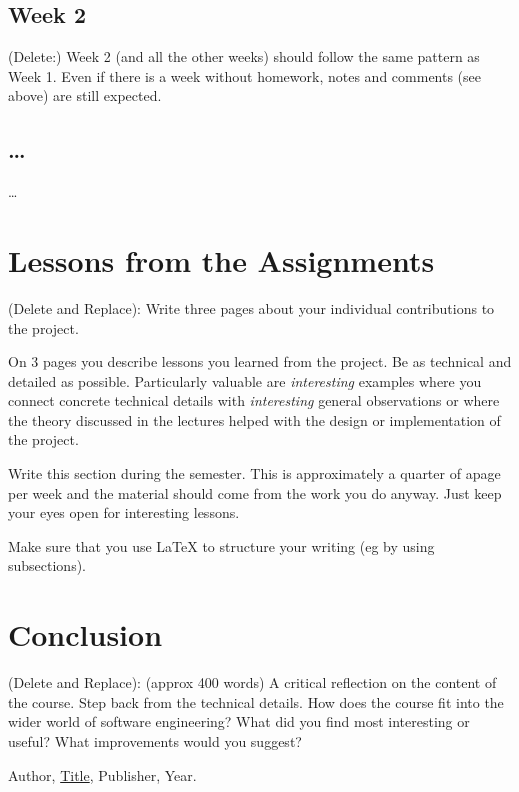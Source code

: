 \documentclass{article}
\theoremstyle{theorem}
\theoremstyle{definition}
\theoremstyle{remark}
\begin{document}
\subsection{Week 2}

(Delete:) Week 2 (and all the other weeks) should follow the same pattern as Week 1. Even if there is a week without homework, notes and comments (see above) are still expected.

\subsection{\ldots}

\ldots

\section{Lessons from the Assignments}

(Delete and Replace): Write three pages about your individual contributions to the project.

On 3 pages you describe lessons you learned from the project. Be as technical and detailed as possible. Particularly valuable are \emph{interesting} examples where you connect concrete technical details with \emph{interesting} general observations or where the theory discussed in the lectures helped with the design or implementation of the project.

Write this section during the semester. This is approximately a quarter of apage per week and the material should come from the work you do anyway. Just keep your eyes open for interesting lessons.

Make sure that you use \LaTeX{} to structure your writing (eg by using subsections).

\section{Conclusion}\label{conclusion}

(Delete and Replace): (approx 400 words) A critical reflection on the content of the course. Step back from the technical details. How does the course fit into the wider world of software engineering? What did you find most interesting or useful? What improvements would you suggest?

\begin{thebibliography}{99}
 Author, \href{https://en.wikipedia.org/wiki/LaTeX}{Title}, Publisher, Year.
\end{thebibliography}
\end{document}
